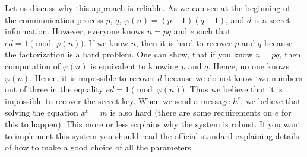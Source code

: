 Let us discuss why this approach is reliable. As we can see at the beginning of the communication process $p$, $q$, $\varphi(n) = (p-1)(q-1)$, and $d$ is a secret information. However, everyone knows $n = pq$ and $e$ such that $ed = 1 \pmod{\varphi(n)}$. If we know $n$, then it is hard to recover $p$  and $q$ because the factorization is a hard problem. One can show, that if you know $n = pq$, then computation of $\varphi(n)$ is equivalent to knowing $p$ and $q$. Hence, no one knows $\varphi(n)$. Hence, it is impossible to recover $d$ because we do not know two numbers out of three in the equality  $ed = 1 \pmod{\varphi(n)}$. Thus we believe that it is impossible to recover the secret key. When we send a message $h^e$, we believe that solving the equation $x^e = m$ is also hard (there are some requirements on $e$ for this to happen). This more or less explains why the system is robust. If you want to implement this system you should read the official standard explaining details of how to make a good choice of all the parameters.

